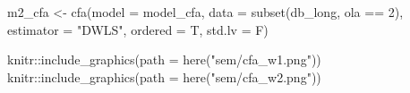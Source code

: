 \documentclass[
  12pt,
]{article}
\newenvironment{Shaded}{\begin{snugshade}}{\end{snugshade}}
\newcommand{\AttributeTok}[1]{\textcolor[rgb]{0.40,0.45,0.13}{#1}}
\newcommand{\DecValTok}[1]{\textcolor[rgb]{0.68,0.00,0.00}{#1}}
\newcommand{\FunctionTok}[1]{\textcolor[rgb]{0.28,0.35,0.67}{#1}}
\newcommand{\NormalTok}[1]{\textcolor[rgb]{0.00,0.23,0.31}{#1}}
\newcommand{\OtherTok}[1]{\textcolor[rgb]{0.00,0.23,0.31}{#1}}
\newcommand{\SpecialCharTok}[1]{\textcolor[rgb]{0.37,0.37,0.37}{#1}}
\newcommand{\StringTok}[1]{\textcolor[rgb]{0.13,0.47,0.30}{#1}}
\begin{document}
\begin{Shaded}
\begin{Highlighting}[]
\NormalTok{m2\_cfa }\OtherTok{\textless{}{-}} \FunctionTok{cfa}\NormalTok{(}\AttributeTok{model =}\NormalTok{ model\_cfa, }
              \AttributeTok{data =} \FunctionTok{subset}\NormalTok{(db\_long, ola }\SpecialCharTok{==} \DecValTok{2}\NormalTok{), }
              \AttributeTok{estimator =} \StringTok{"DWLS"}\NormalTok{,}
              \AttributeTok{ordered =}\NormalTok{ T,}
              \AttributeTok{std.lv =}\NormalTok{ F)}

\NormalTok{knitr}\SpecialCharTok{::}\FunctionTok{include\_graphics}\NormalTok{(}\AttributeTok{path =} \FunctionTok{here}\NormalTok{(}\StringTok{"sem/cfa\_w1.png"}\NormalTok{))}
\NormalTok{knitr}\SpecialCharTok{::}\FunctionTok{include\_graphics}\NormalTok{(}\AttributeTok{path =} \FunctionTok{here}\NormalTok{(}\StringTok{"sem/cfa\_w2.png"}\NormalTok{))}
\end{Highlighting}
\end{Shaded}
\end{document}
